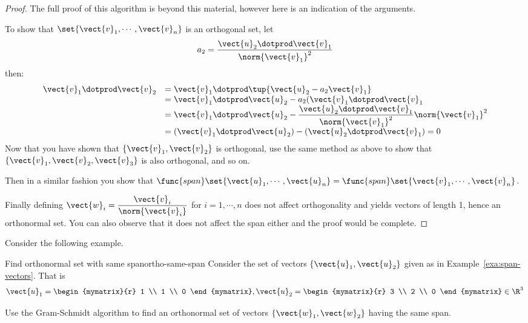 \begin{proof}
The full proof of this algorithm is beyond this material, however here is an indication of the arguments. 

To show that  $\set{\vect{v}_1,\cdots , \vect{v}_n  } $ is an orthogonal set, let 
\[ a_2 =  \dfrac{ \vect{u}_2 \dotprod \vect{v}_1}{\norm{\vect{v}_1}^2} \]
then: 
\[
\begin{array}{ll}
 \vect{v}_1 \dotprod \vect{v}_2 &  =  \vect{v}_1 \dotprod \tup{\vect{u}_2 - a_2 \vect{v}_1 }  \\
 & = \vect{v}_1 \dotprod \vect{u}_2 - a_2 (\vect{v}_1 \dotprod \vect{v}_1  \\
 & = \vect{v}_1 \dotprod \vect{u}_2 - \dfrac{ \vect{u}_2 \dotprod \vect{v}_1}{\norm{\vect{v}_1}^2} \norm{\vect{v}_1}^2 \\
 & = ( \vect{v}_1 \dotprod \vect{u}_2 ) - ( \vect{u}_2 \dotprod \vect{v}_1 ) =0\\
\end{array}
\]
Now that you have shown that $\{\vect{v}_1, \vect{v}_2\}$ is orthogonal,  use the same method as above to show that 
$\{\vect{v}_1, \vect{v}_2, \vect{v}_3\}$ is also orthogonal,  and so on. 

Then in a similar fashion you show that $\func{span}\set{
\vect{u}_1,\cdots ,\vect{u}_n } = \func{span}\set{
\vect{v}_1,\cdots ,\vect{v}_n }$.

Finally defining $\vect{w}_i =
\dfrac{\vect{v}_i}{\norm{\vect{v}_i}}$ for $i=1, \cdots
,n$ does not affect orthogonality and yields vectors of length 1,
hence an orthonormal set. You can also observe that it does not affect
the span either and the proof would be complete.
\end{proof}

Consider the following example.

\begin{example}{Find orthonormal set with same span}{ortho-same-span}
Consider the set of vectors $\{\vect{u}_1, \vect{u}_2\}$ given as in Example~\ref{exa:span-vectors}. That is  
\[
\vect{u}_1=\begin{mymatrix}{r}
1 \\
1 \\
0
\end{mymatrix}, \vect{u}_2=\begin{mymatrix}{r}
3 \\
2 \\
0
\end{mymatrix} \in \R^{3} 
\]

Use the Gram-Schmidt algorithm to find an orthonormal set of vectors $\{\vect{w}_1, \vect{w}_2\}$ having the same span.
\end{example}

